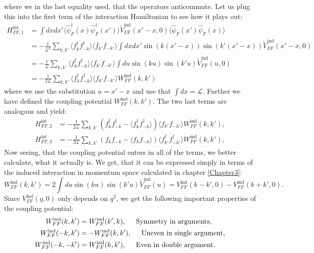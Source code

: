 where we in the last equality used, that the operators anticommute. Let us plug this into the first term of the interaction Hamiltonian to see how it plays out: 
\begin{align}
H^\text{int}_{FF,1} &= \int dxdx' \langle \hat{\psi}^\dagger_F(x) \hat{\psi}^\dagger_F(x') \rangle \tilde{V}^\text{ind}_{FF}(x'-x,0) \langle \hat{\psi}_F(x') \hat{\psi}_F(x) \rangle \nonumber \\
&= - \frac{1}{\mathcal{L}^2}\sum_{k,k'}\langle f^\dagger_{k}f^\dagger_{-k} \rangle \langle f_{k'}f_{-k'} \rangle \int dx dx' \sin(k(x'-x))\sin(k'(x'-x))\tilde{V}^\text{ind}_{FF}(x'-x,0) \nonumber \\
&= - \frac{1}{\mathcal{L}}\sum_{k,k'}\langle f^\dagger_{k}f^\dagger_{-k} \rangle \langle f_{k'}f_{-k'} \rangle \int du \sin(ku)\sin(k'u)\tilde{V}^\text{ind}_{FF}(u,0) \nonumber \\
&= - \frac{1}{2\mathcal{L}}\sum_{k,k'}\langle f^\dagger_{k}f^\dagger_{-k} \rangle \langle f_{k'}f_{-k'} \rangle W^\text{ind}_{FF}(k,k')
\end{align}
where we use the substitution $u = x'-x$ and use that $\int dx = \mathcal{L}$. Further we have defined the coupling potential $W^\text{ind}_{FF}(k,k')$. The two last terms are analogous and yield:
\begin{align}
H^\text{int}_{FF,2} &= - \frac{1}{2\mathcal{L}}\sum_{k,k'}\left(f^\dagger_k f^\dagger_{-k} - \langle f^\dagger_k f^\dagger_{-k}\rangle\right)\langle f_{k'}f_{-k'} \rangle W^\text{ind}_{FF}(k,k'), \nonumber \\
H^\text{int}_{FF,3} &= - \frac{1}{2\mathcal{L}}\sum_{k,k'}\left(f_k f_{-k} - \langle f_k f_{-k}\rangle\right)\langle f^\dagger_{k'}f^\dagger_{-k'} \rangle W^\text{ind}_{FF}(k,k'), \nonumber
\end{align}
Now seeing, that the coupling potential enters in all of the terms, we better calculate, what it actually is. We get, that it can be expressed simply in terms of the induced interaction in momentum space calculated in chapter \ref{Chapter3}:
\begin{equation}
W^\text{ind}_{FF}(k,k') = 2\int du \sin(ku)\sin(k'u)\tilde{V}^\text{ind}_{FF}(u) = V^\text{ind}_{FF}(k-k',0) - V^\text{ind}_{FF}(k+k',0).
\label{eq.CouplingPotential}
\end{equation}
Since $V^\text{ind}_{FF}(q,0)$ only depends on $q^2$, we get the following important properties of the coupling potential: 
\begin{align}
W^\text{ind}_{FF}(k,k') &= W^\text{ind}_{FF}(k',k), \hspace{0.5cm} \text{Symmetry in arguments}, \nonumber \\
W^\text{ind}_{FF}(-k,k') &= -W^\text{ind}_{FF}(k,k'), \hspace{0.5cm} \text{Uneven in single argument}, \nonumber \\
W^\text{ind}_{FF}(-k,-k') &= W^\text{ind}_{FF}(k,k'), \hspace{0.5cm} \text{Even in double argument}.
\label{eq.CouplingPotentialSymmetries}
\end{align}
